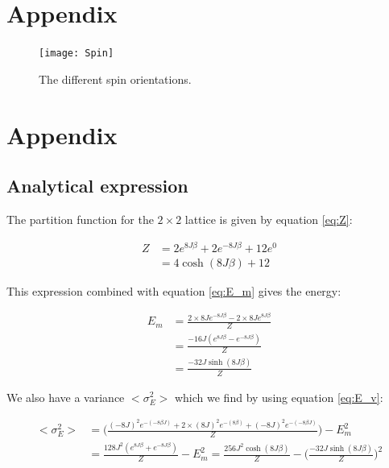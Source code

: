 \documentclass{article}
\begin{document}
\clearpage

\appendix %

\section{Appendix}

\begin{figure}[H]
	\centering
	\texttt{[image: Spin]}
	\caption{The different spin orientations.}
	\label{fig:spinn}
\end{figure}

\section{Appendix}
\subsection*{Analytical expression}

The partition function for the $2\times2$ lattice is given by equation \ref{eq:Z}:

\begin{equation}
\begin{split}
Z&=2e^{8J\beta}+2e^{-8J\beta}+12e^0\\
&=4\cosh{(8J\beta)}+12
\end{split}
\label{eq:calc_Z}
\end{equation}

This expression combined with equation \ref{eq:E_m} gives the energy:

\begin{equation}
\begin{split}
E_m &= \frac{2\times8Je^{-8J\beta}-2\times8Je^{8J\beta}}{Z}\\
&=\frac{-16J(e^{8J\beta}-e^{-8J\beta})}{Z}\\
&=\frac{-32J\sinh{(8J\beta)}}{Z}
\label{eq:calc_E}
\end{split}
\end{equation}

We also have a variance $<\sigma_E^2>$ which we find by using equation \ref{eq:E_v}:

\begin{equation}
\begin{split}
<\sigma_E^2>&=\bigg(\frac{(-8J)^2e^{-(-8\beta J)} + 2 \times (8J)^2e^{-(8\beta)}+(-8J)^2e^{-(-8\beta J)}}{Z}\bigg)-E_m^2\\
&=\frac{128J^2(e^{8J\beta}+e^{-8J\beta})}{Z}-E_m^2=\frac{256J^2\cosh{(8J\beta)}}{Z}-\bigg(\frac{-32J\sinh{(8J\beta)}}{Z}\bigg)^2
\label{eq:calc_Ev}
\end{split}
\end{equation}
\end{document}
